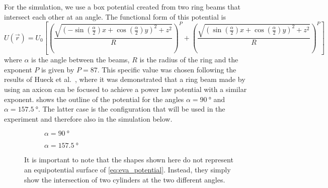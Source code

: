 For the simulation, we use a box potential created from two ring beams that intersect each other at an angle. The functional form of this potential is
\begin{equation} \label{eq:eva_potential}
    U(\vec{r}) = U_0 \left[ \left( \frac{\sqrt{(-\sin(\frac{\alpha}{2})x + \cos(\frac{\alpha}{2})y)^2 + z^2}}{R} \right) ^ P + \left( \frac{\sqrt{(\sin(\frac{\alpha}{2})x + \cos(\frac{\alpha}{2})y)^2 + z^2}}{R} \right) ^ P \right]
\end{equation}
where $\alpha$ is the angle between the beams, $R$ is the radius of the ring and the exponent $P$ is given by $P = \num{87}$. This specific value was chosen following the results of Hueck et al.~\cite{PhysRevLett.120.060402}, where it was demonstrated that a ring beam made by using an axicon can be focused to achieve a power law potential with a similar exponent. 
 shows the outline of the potential for the angles $\alpha=\SI{90}{\degree}$ and $\alpha=\SI{157.5}{\degree}$. The latter case is the configuration that will be used in the experiment and therefore also in the simulation below.
\vfill
\begin{figure}[htbp]
    \centering
    \begin{subfigure}[b]{.49\textwidth}
        \centering
        
        \caption{$\alpha = \SI{90}{\degree}$}
    \end{subfigure}
    \begin{subfigure}[b]{.49\textwidth}
        \centering
        
        \caption{$\alpha = \SI{157.5}{\degree}$}
    \end{subfigure}
    \caption[Common volume of two crossed cylinders]{It is important to note that the shapes shown here do not represent an equipotential surface of \cref{eq:eva_potential}. Instead, they simply show the intersection of two cylinders at the two different angles.}
    \label{fig:steinmetz_solid}
\end{figure}
\vfill


